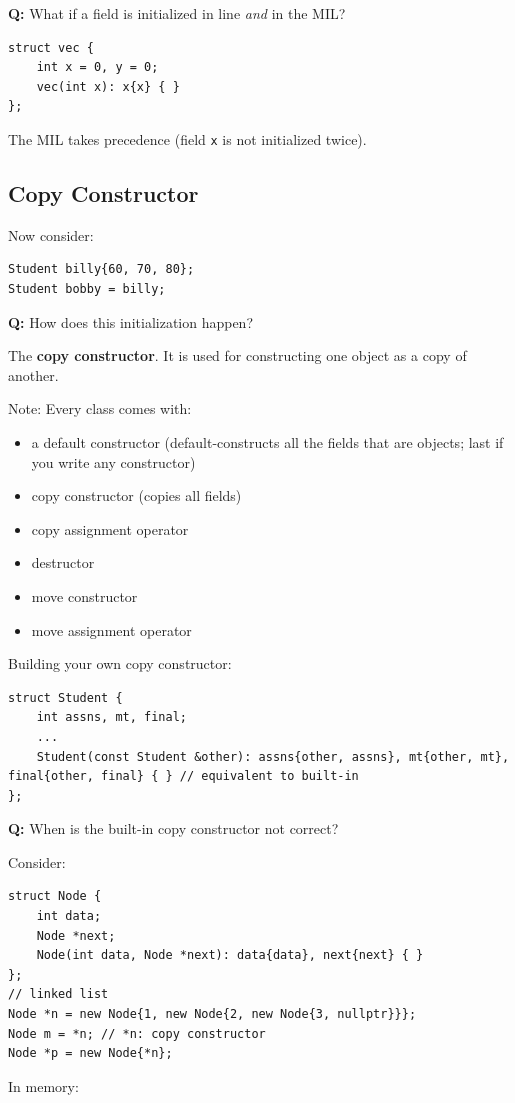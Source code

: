 \documentclass[11pt]{article}
\theoremstyle{definition}
\begin{document}
{\bf Q:} What if a field is initialized in line {\it and} in the MIL?
\begin{lstlisting}
struct vec {
    int x = 0, y = 0;
    vec(int x): x{x} { }
};
\end{lstlisting}
The MIL takes precedence (field {\tt x} is not initialized twice).

\subsection{Copy Constructor}
Now consider:
\begin{lstlisting}
Student billy{60, 70, 80};
Student bobby = billy;
\end{lstlisting}
{\bf Q:} How does this initialization happen?

The {\bf copy constructor}. It is used for constructing one object as a copy of another.

Note: Every class comes with: \vspace{-0.25cm}
\begin{multicols}{2}
\begin{itemize}
    \item a default constructor (default-constructs all the fields that are objects; last if you write any constructor)
    \item copy constructor (copies all fields)
    \item copy assignment operator
    \item destructor
    \item move constructor
    \item move assignment operator
\end{itemize}
\end{multicols}
Building your own copy constructor:
\begin{lstlisting}
struct Student {
    int assns, mt, final;
    ...
    Student(const Student &other): assns{other, assns}, mt{other, mt}, final{other, final} { } // equivalent to built-in
};
\end{lstlisting}
{\bf Q:} When is the built-in copy constructor not correct?

Consider:
\begin{lstlisting}
struct Node {
    int data;
    Node *next;
    Node(int data, Node *next): data{data}, next{next} { }
};
// linked list
Node *n = new Node{1, new Node{2, new Node{3, nullptr}}};
Node m = *n; // *n: copy constructor
Node *p = new Node{*n};
\end{lstlisting}
In memory:
\end{document}
